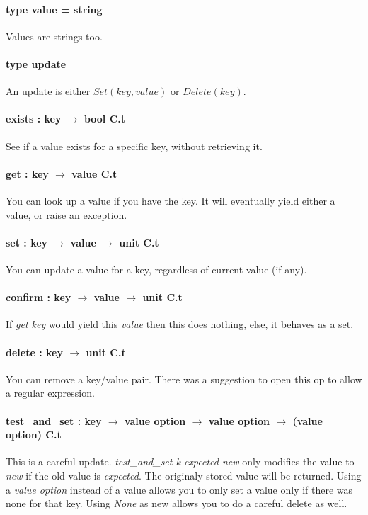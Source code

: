 \paragraph{type value = string}
Values are strings too.
\paragraph{type update}
An update is either $Set(key,value)$ or $Delete(key)$.

\paragraph{exists : key $\rightarrow$ bool C.t} See if a value exists for a specific key, without retrieving it.

\paragraph{get : key $\rightarrow$ value C.t}
You can look up a value if you have the key. It will eventually yield either a value, or raise an exception.

\paragraph{set : key $\rightarrow$ value $\rightarrow$ unit C.t}
You can update a value for a key, regardless of current value (if any).

\paragraph{confirm : key $\rightarrow$ value $\rightarrow$ unit C.t}
If \emph{get key} would yield this \emph{value} then this does nothing, 
else, it behaves as a set.

\paragraph{delete : key $\rightarrow$ unit C.t}
You can remove a key/value pair. 
There was a suggestion to open this op to allow a regular expression.

\paragraph{test\_and\_set : key $\rightarrow$ value option $\rightarrow$ value option $\rightarrow$ (value option) C.t} This is a careful update.
\emph{test\_and\_set k expected new} only modifies the value to \emph{new} if the old value is \emph{expected}.
The originaly stored value will be returned.
Using a \emph{value option} instead of a value allows you to only set a value only if there was none for that key.
Using \emph{None} as new allows you to do a careful delete as well.

